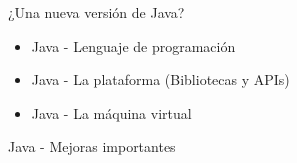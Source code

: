 \documentclass[aspectratio=169]{beamer}
\begin{document}

\begin{frame}[fragile]{¿Una nueva versión de Java?}
	\begin{itemize}
		\item Java - Lenguaje de programación
		\item Java - La plataforma (Bibliotecas y APIs)
		\item Java - La máquina virtual
	\end{itemize}	
\end{frame}



\begin{frame}[fragile]{Java - Mejoras importantes}
	\begin{columns}[T] %
		

\end{columns}
\end{frame}
\end{document}
